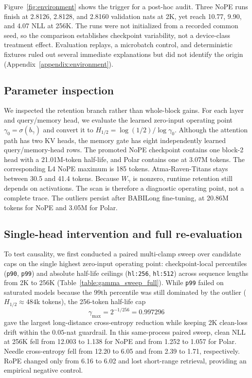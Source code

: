 \documentclass{article}
\begin{document}
Figure~\ref{fig:environment} shows the trigger for a post-hoc audit. Three NoPE runs finish at 2.8126, 2.8128, and 2.8160 validation nats at 2K, yet reach 10.77, 9.90, and 4.07 NLL at 256K. The runs were not initialized from a recorded common seed, so the comparison establishes checkpoint variability, not a device-class treatment effect. Evaluation replays, a microbatch control, and deterministic fixtures ruled out several immediate explanations but did not identify the origin (Appendix~\ref{appendix:environment}).

\subsection{Parameter inspection}
We inspected the retention branch rather than whole-block gains. For each layer and query/memory head, we evaluate the learned zero-input operating point $\gamma_0=\sigma(b_\gamma)$ and convert it to $H_{1/2}=\log(1/2)/\log\gamma_0$. Although the attention path has two KV heads, the memory gate has eight independently learned query/memory-head rows. The promoted NoPE checkpoint contains one block-2 head with a 21.01M-token half-life, and Polar contains one at 3.07M tokens. The corresponding L4 NoPE maximum is 185 tokens. Atma-Raven-Titans stays between 30.5 and 41.4 tokens. Because $W_\gamma$ is nonzero, runtime retention still depends on activations. The scan is therefore a diagnostic operating point, not a complete trace. The outliers persist after BABILong fine-tuning, at 20.86M tokens for NoPE and 3.05M for Polar.

\subsection{Single-head intervention and full re-evaluation}
To test causality, we first conducted a paired multi-clamp sweep over candidate caps on the single highest zero-input operating point: checkpoint-local percentiles (\texttt{p90}, \texttt{p99}) and absolute half-life ceilings (\texttt{hl:256}, \texttt{hl:512}) across sequence lengths from 2K to 256K (Table~\ref{table:gamma_sweep_full}). While \texttt{p99} failed on saturated models because the 99th percentile was still dominated by the outlier ($H_{1/2} \approx 484$k tokens), the 256-token half-life cap
\begin{equation}
 \gamma_{\max}=2^{-1/256}=0.997296
\end{equation}
gave the largest long-distance cross-entropy reduction while keeping 2K clean-loss drift within the $0.05$-nat guardrail. In this same-process paired sweep, clean NLL at 256K fell from 12.003 to 1.138 for NoPE and from 1.252 to 1.057 for Polar. Needle cross-entropy fell from 12.20 to 6.05 and from 2.39 to 1.71, respectively. RoPE changed only from 6.16 to 6.02 and lost short-range retrieval, providing an empirical negative control.
\end{document}
